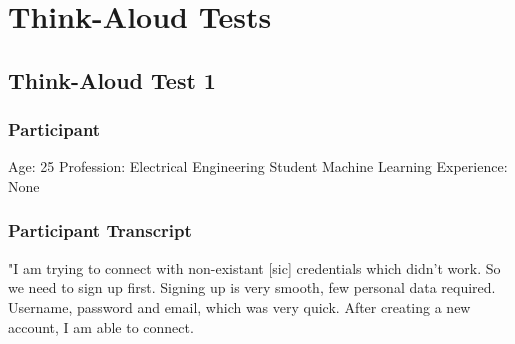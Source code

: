 \section{Think-Aloud Tests}
\subsection{Think-Aloud Test 1}
\subsubsection{Participant}
Age: 25
\newline
Profession: Electrical Engineering Student
\newline
Machine Learning Experience: None
\newline

\subsubsection{Participant Transcript}
"I am trying to connect with non-existant [sic] credentials which didn't work. So we need to sign up first. Signing up is very smooth, few personal data required. Username, password and email, which was very quick. After creating a new account, I am able to connect. 
